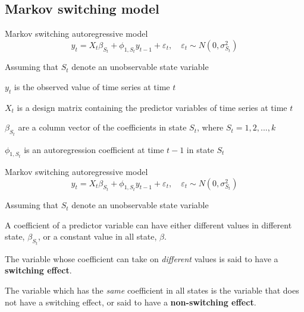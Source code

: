 \documentclass{beamer}
\begin{document}
\subsection{Markov switching model}
\begin{frame}

\begin{block}{Markov switching autoregressive model}
\[
y_{t} = X_{t}\beta_{S_{t}} + \phi_{1,S_{t}} y_{t-1} + \varepsilon_{t}, \quad \varepsilon_{t} \sim N(0,\sigma^{2}_{S_{t}})
\]
\end{block}

Assuming that $S_{t}$ denote an unobservable state variable

$y_{t}$ is the observed value of time series at time $t$ 

$X_{t}$ is a design matrix containing the predictor variables of time series at time $t$ 

$\beta_{S_{t}}$ are a column vector of the coefficients in state $S_{t}$, where $S_{t}=1,2,...,k$

$\phi_{1,S_{t}}$ is an autoregression coefficient at time $t-1$ in state $S_{t}$


\end{frame}

\begin{frame}

\begin{block}{Markov switching autoregressive model}
\[
y_{t} = X_{t}\beta_{S_{t}} + \phi_{1,S_{t}} y_{t-1} + \varepsilon_{t}, \quad \varepsilon_{t} \sim N(0,\sigma^{2}_{S_{t}})
\]
\end{block}

Assuming that $S_{t}$ denote an unobservable state variable

\vspace{1em}

A coefficient of a predictor variable can have either different values in different state, $\beta_{S_{t}}$,  or a constant value in all state, $\beta$. 

\vspace{1em}

The variable whose coefficient can take on \textit{different} values is said to have a \textbf{switching effect}. 

\vspace{1em}

The variable which has the \textit{same} coefficient in all states is the variable that does not have a switching effect, or said to have a \textbf{non-switching effect}. 
\end{frame}
\end{document}
